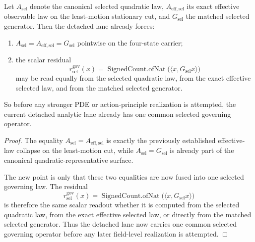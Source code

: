 \begin{theorem}
\label{thm:the-exact-effective-selected-law-already-is-the-matched-selected-generator}
Let \(A_{\mathrm{sel}}\) denote the canonical selected quadratic law,
\(A_{\mathrm{eff},\mathrm{sel}}\) its exact effective observable law on the
least-motion stationary cut, and \(G_{\mathrm{sel}}\) the matched selected
generator. Then the detached lane already forces:
\begin{enumerate}
\item \(A_{\mathrm{sel}}=A_{\mathrm{eff},\mathrm{sel}}=G_{\mathrm{sel}}\)
      pointwise on the four-state carrier;
\item the scalar residual
      \[
      r^{\mathrm{gov}}_{\mathrm{sel}}(x)=
      \operatorname{SignedCount.ofNat}\!\bigl(\langle x,G_{\mathrm{sel}}x\rangle\bigr)
      \]
      may be read equally from the selected quadratic law, from the exact
      effective selected law, and from the matched selected generator.
\end{enumerate}
So before any stronger PDE or action-principle realization is attempted, the
current detached analytic lane already has one common selected governing
operator.
\end{theorem}

\begin{proof}
The equality
\(A_{\mathrm{sel}}=A_{\mathrm{eff},\mathrm{sel}}\)
is exactly the previously established effective-law collapse on the
least-motion cut, while
\(A_{\mathrm{sel}}=G_{\mathrm{sel}}\)
is already part of the canonical quadratic-representative surface.

The new point is only that these two equalities are now fused into one
selected governing law. The residual
\[
r^{\mathrm{gov}}_{\mathrm{sel}}(x)
=
\operatorname{SignedCount.ofNat}\!\bigl(\langle x,G_{\mathrm{sel}}x\rangle\bigr)
\]
is therefore the same scalar readout whether it is computed from the selected
quadratic law, from the exact effective selected law, or directly from the
matched selected generator. Thus the detached lane now carries one common
selected governing operator before any later field-level realization is
attempted.
\end{proof}

